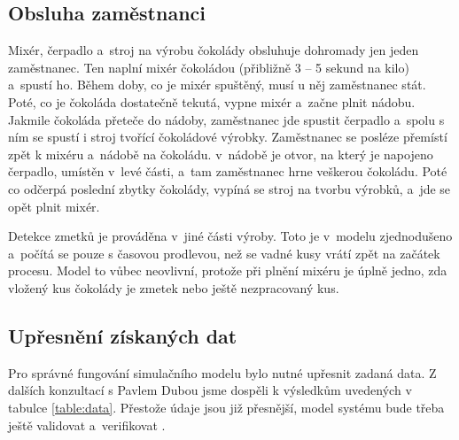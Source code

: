 \documentclass[11pt,a4paper,titlepage]{article}
\begin{document}
		\subsection{Obsluha zaměstnanci}
			Mixér, čerpadlo a~stroj na výrobu čokolády obsluhuje dohromady jen jeden
			zaměstnanec. Ten naplní mixér čokoládou (přibližně 3 -- 5 sekund na kilo) a~spustí ho.
			Během doby, co je mixér spuštěný, musí u něj zaměstnanec stát. Poté, co je čokoláda
			dostatečně tekutá, vypne mixér a~začne plnit nádobu. Jakmile čokoláda
			přeteče do nádoby, zaměstnanec jde spustit čerpadlo a~spolu s ním
			se spustí i stroj tvořící čokoládové výrobky. Zaměstnanec se posléze
			přemístí zpět k mixéru a~nádobě na čokoládu. v~nádobě je otvor, na
			který je napojeno čerpadlo, umístěn v~levé části, a~tam zaměstnanec
			hrne veškerou čokoládu. Poté co odčerpá poslední zbytky čokolády,
			vypíná se stroj na tvorbu výrobků, a~jde se opět plnit mixér.

			Detekce	zmetků je prováděna v~jiné části výroby. Toto je v~modelu
			zjednodušeno a~počítá se pouze s časovou prodlevou, než se vadné
			kusy vrátí zpět na začátek procesu. Model to vůbec neovlivní,
			protože při plnění mixéru je úplně jedno, zda vložený kus čokolády je
			zmetek nebo ještě nezpracovaný kus.

		\subsection{Upřesnění získaných dat} \label{upresneni_dat}
			Pro správné fungování simulačního modelu \cite[strany 44 a 49]{web:prednasky}
			bylo nutné upřesnit zadaná data. Z
			dalších konzultací s Pavlem Dubou jsme dospěli k výsledkům uvedených
			v tabulce \ref{table:data}. Přestože údaje jsou již přesnější, model
			systému bude třeba ještě validovat a~verifikovat \cite[strany 36 a 37]{web:prednasky}.
\end{document}
